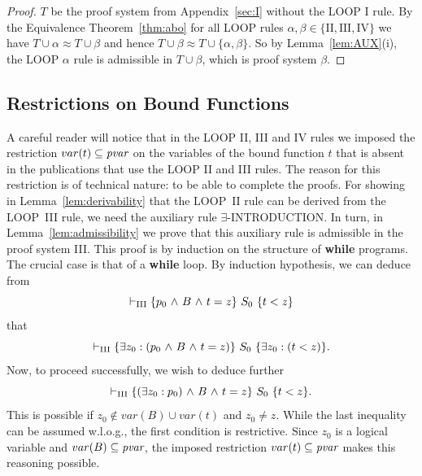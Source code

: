 \documentclass[runningheads]{llncs}       %
\begin{document}
\begin{proof}
  $T$ be the proof system from Appendix~\ref{sec:I} without the LOOP I
  rule.  By the Equivalence Theorem~\ref{thm:abo} for all LOOP rules
  $\alpha, \beta \in \{\mathrm{II, III, IV}\}$ we have
  $T \cup \alpha \approx T \cup \beta$ and hence
  $T \cup \beta \approx T \cup \{\alpha, \beta\}$.  So by
  Lemma~\ref{lem:AUX}(i), the LOOP $\alpha$ rule is 
  admissible in $T \cup \beta$, which is proof system $\beta$.
\HB
\end{proof}



\subsection{Restrictions on Bound Functions}

A careful reader will notice that in the LOOP II, III and IV rules we
imposed the restriction $var(t) \subseteq \mbox{\it pvar}$ on the
variables of the bound function $t$ that is absent in the publications
that use the LOOP II and III rules.
The reason for this restriction is of technical nature: to be able 
to complete the proofs.
For showing in Lemma~\ref{lem:derivability} that the LOOP~II rule can
be derived from the LOOP~III rule, we need the auxiliary rule
$\exists$-INTRODUCTION. In turn, in Lemma~\ref{lem:admissibility}
we prove that this auxiliary rule is admissible in the proof system III.
This proof is by induction on the structure of {\bf while} programs.
The crucial case is that of a {\bf while} loop. By induction hypothesis,
we can deduce from 
\[
 \vdash_{\rm{III}} \mbox{$\{{p_{0} \mbox{$\ \wedge\ $} B \mbox{$\ \wedge\ $} t = z}\}\ {S_0}\ \{{t < z}\}$}
\]
that
\[
 \vdash_{\rm{III}} \mbox{$\{{\mbox{$\exists$} z_0: (p_{0} \mbox{$\ \wedge\ $} B \mbox{$\ \wedge\ $} t = z)}\}\ {S_0}\ \{{\mbox{$\exists$} z_0: (t < z)}\}$}.
\]
Now, to proceed successfully, we wish to deduce further 
\[
 \vdash_{\rm{III}} \mbox{$\{{(\mbox{$\exists$} z_0:p_0) \mbox{$\ \wedge\ $} B \mbox{$\ \wedge\ $} t = z}\}\ {S_0}\ \{{t < z}\}$}.
\]
This is possible if $z_0 \not\in var(B) \cup var(t)$ and $z_0 \neq z$.
While the last inequality can be assumed w.l.o.g., the first condition
is restrictive.
Since $z_0$ is a logical variable and $var(B) \subseteq \mbox{\it pvar}$,
the imposed restriction $var(t) \subseteq \mbox{\it pvar}$ makes this reasoning
possible.
\end{document}
